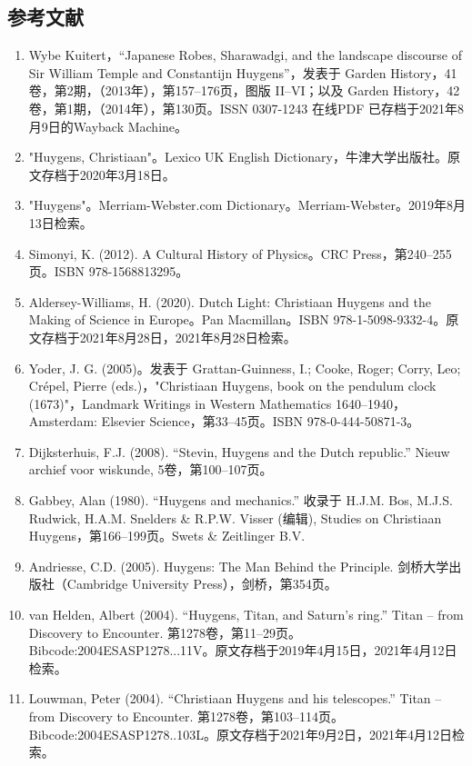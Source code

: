 \subsection{参考文献}
\begin{enumerate}
\item Wybe Kuitert，“Japanese Robes, Sharawadgi, and the landscape discourse of Sir William Temple and Constantijn Huygens”，发表于 Garden History，41卷，第2期，（2013年），第157–176页，图版 II–VI；以及 Garden History，42卷，第1期，（2014年），第130页。ISSN 0307-1243 在线PDF 已存档于2021年8月9日的Wayback Machine。
\item "Huygens, Christiaan"。Lexico UK English Dictionary，牛津大学出版社。原文存档于2020年3月18日。
\item "Huygens"。Merriam-Webster.com Dictionary。Merriam-Webster。2019年8月13日检索。
\item Simonyi, K. (2012). A Cultural History of Physics。CRC Press，第240–255页。ISBN 978-1568813295。
\item Aldersey-Williams, H. (2020). Dutch Light: Christiaan Huygens and the Making of Science in Europe。Pan Macmillan。ISBN 978-1-5098-9332-4。原文存档于2021年8月28日，2021年8月28日检索。
\item Yoder, J. G. (2005)。发表于 Grattan-Guinness, I.; Cooke, Roger; Corry, Leo; Crépel, Pierre (eds.)，"Christiaan Huygens, book on the pendulum clock (1673)"，Landmark Writings in Western Mathematics 1640–1940，Amsterdam: Elsevier Science，第33–45页。ISBN 978-0-444-50871-3。
\item Dijksterhuis, F.J. (2008). “Stevin, Huygens and the Dutch republic.” Nieuw archief voor wiskunde, 5卷，第100–107页。
\item Gabbey, Alan (1980). “Huygens and mechanics.” 收录于 H.J.M. Bos, M.J.S. Rudwick, H.A.M. Snelders & R.P.W. Visser (编辑), Studies on Christiaan Huygens，第166–199页。Swets & Zeitlinger B.V.
\item Andriesse, C.D. (2005). Huygens: The Man Behind the Principle. 剑桥大学出版社（Cambridge University Press），剑桥，第354页。
\item van Helden, Albert (2004). “Huygens, Titan, and Saturn's ring.” Titan – from Discovery to Encounter. 第1278卷，第11–29页。Bibcode:2004ESASP1278...11V。原文存档于2019年4月15日，2021年4月12日检索。
\item Louwman, Peter (2004). “Christiaan Huygens and his telescopes.” Titan – from Discovery to Encounter. 第1278卷，第103–114页。Bibcode:2004ESASP1278..103L。原文存档于2021年9月2日，2021年4月12日检索。

\end{enumerate}
